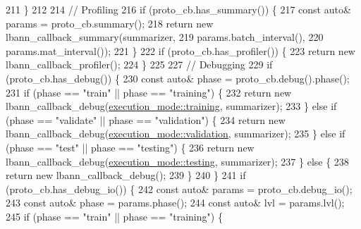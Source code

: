 \begin{DoxyCode}
211   \}
212 
214   \textcolor{comment}{// Profiling}
216 \textcolor{comment}{}  \textcolor{keywordflow}{if} (proto\_cb.has\_summary()) \{
217     \textcolor{keyword}{const} \textcolor{keyword}{auto}& params = proto\_cb.summary();
218     \textcolor{keywordflow}{return} \textcolor{keyword}{new} lbann\_callback\_summary(summarizer,
219                                       params.batch\_interval(),
220                                       params.mat\_interval());
221   \}
222   \textcolor{keywordflow}{if} (proto\_cb.has\_profiler()) \{
223     \textcolor{keywordflow}{return} \textcolor{keyword}{new} lbann\_callback\_profiler();
224   \}
225 
227   \textcolor{comment}{// Debugging}
229 \textcolor{comment}{}  \textcolor{keywordflow}{if} (proto\_cb.has\_debug()) \{
230     \textcolor{keyword}{const} \textcolor{keyword}{auto}& phase = proto\_cb.debug().phase();
231     \textcolor{keywordflow}{if} (phase == \textcolor{stringliteral}{"train"} || phase == \textcolor{stringliteral}{"training"}) \{
232       \textcolor{keywordflow}{return} \textcolor{keyword}{new} lbann\_callback\_debug(\hyperlink{base_8hpp_a2781a159088df64ed7d47cc91c4dc0a8ac185ddac8b5a8f5aa23c5b80bc12d214}{execution\_mode::training}, summarizer);
233     \} \textcolor{keywordflow}{else} \textcolor{keywordflow}{if} (phase == \textcolor{stringliteral}{"validate"} || phase == \textcolor{stringliteral}{"validation"}) \{
234       \textcolor{keywordflow}{return} \textcolor{keyword}{new} lbann\_callback\_debug(\hyperlink{base_8hpp_a2781a159088df64ed7d47cc91c4dc0a8aa617908b172c473cb8e8cda059e55bf0}{execution\_mode::validation}, summarizer);
235     \} \textcolor{keywordflow}{else} \textcolor{keywordflow}{if} (phase == \textcolor{stringliteral}{"test"} || phase == \textcolor{stringliteral}{"testing"}) \{
236       \textcolor{keywordflow}{return} \textcolor{keyword}{new} lbann\_callback\_debug(\hyperlink{base_8hpp_a2781a159088df64ed7d47cc91c4dc0a8aae2b1fca515949e5d54fb22b8ed95575}{execution\_mode::testing}, summarizer);
237     \} \textcolor{keywordflow}{else} \{
238       \textcolor{keywordflow}{return} \textcolor{keyword}{new} lbann\_callback\_debug();
239     \}
240   \}
241   \textcolor{keywordflow}{if} (proto\_cb.has\_debug\_io()) \{
242     \textcolor{keyword}{const} \textcolor{keyword}{auto}& params = proto\_cb.debug\_io();
243     \textcolor{keyword}{const} \textcolor{keyword}{auto}& phase = params.phase();
244     \textcolor{keyword}{const} \textcolor{keyword}{auto}& lvl = params.lvl();
245     \textcolor{keywordflow}{if} (phase == \textcolor{stringliteral}{"train"} || phase == \textcolor{stringliteral}{"training"}) \{

\end{DoxyCode}

